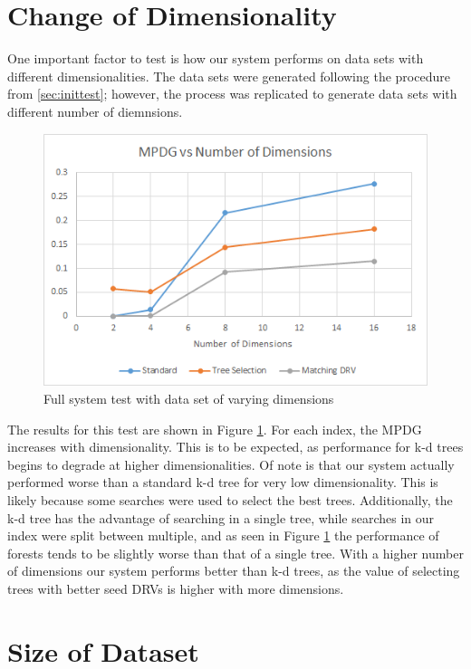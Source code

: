 \section{Change of Dimensionality}

One important factor to test is how our system performs on data sets with different dimensionalities.  The data sets were generated following the procedure from \ref{sec:inittest}; however, the process was replicated to generate data sets with different number of diemnsions.

\begin{figure}[h]
\begin{center}
\includegraphics[width=.85\textwidth]{Figures/dims}
\end{center}
\caption{Full system test with data set of varying dimensions}
\label{fig:dim}
\end{figure}

The results for this test are shown in Figure \ref{fig:dim}.  For each index, the MPDG increases with dimensionality.  This is to be expected, as performance for k-d trees begins to degrade at higher dimensionalities.  Of note is that our system actually performed worse than a standard k-d tree for very low dimensionality.  This is likely because some searches were used to select the best trees.  Additionally, the k-d tree has the advantage of searching in a single tree, while searches in our index were split between multiple, and as seen in Figure \ref{fig:dim} the performance of forests tends to be slightly worse than that of a single tree.  With a higher number of dimensions our system performs better than k-d trees, as the value of selecting trees with better seed DRVs is higher with more dimensions.

\section{Size of Dataset}

